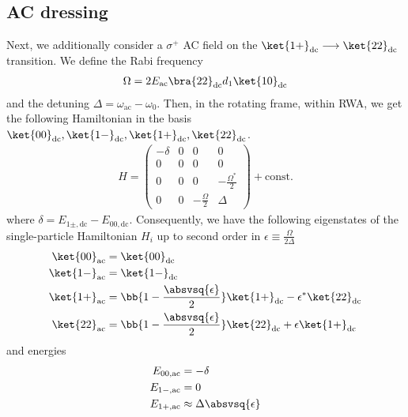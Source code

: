 \subsection{AC dressing}
Next, we additionally consider a $\sigma^+$ AC field on the $\ket{1+}_\text{dc}\longrightarrow\ket{22}_\text{dc}$ transition. We define the Rabi frequency
\begin{align}
\Omega=2E_\text{ac}\bra{22}_\text{dc}d_1\ket{10}_\text{dc}
\end{align}
and the detuning $\Delta=\omega_\text{ac}-\omega_0$.
Then, in the rotating frame, within RWA, we
get the following Hamiltonian in the basis
$\ket{00}_\text{dc},\ket{1-}_\text{dc},\ket{1+}_\text{dc},\ket{22}_\text{dc}$.
\begin{align}
H=\begin{pmatrix} -\delta & 0 & 0 & 0\\
0 & 0 & 0 & 0\\
0 & 0 & 0 & -\frac{\Omega^*}{2} \\
0 & 0 & -\frac{\Omega}{2} & \Delta
\end{pmatrix}+\text{const.}
\end{align}
where $\delta = E_{1\pm,\text{dc}}-E_{00,\text{dc}}$. Consequently, we have the following eigenstates of the single-particle Hamiltonian $H_i$ up to second order in $\epsilon\equiv\frac{\Omega}{2\Delta}$
\begin{align}
\ket{00}_\text{ac}&=\ket{00}_\text{dc}\\
\ket{1-}_\text{ac}&=\ket{1-}_\text{dc}\\
    \ket{1+}_\text{ac}&=\bb{1-\frac{\absvsq{\epsilon}}{2}}\ket{1+}_\text{dc}-\epsilon^*\ket{22}_\text{dc}\\
    \ket{22}_\text{ac}&=\bb{1-\frac{\absvsq{\epsilon}}{2}}\ket{22}_\text{dc}+\epsilon\ket{1+}_\text{dc}
\end{align}
and energies
\begin{align}
E_{00,\text{ac}}&=-\delta\\
E_{1-,\text{ac}}&=0\\
E_{1+,\text{ac}}&\approx \Delta\absvsq{\epsilon}
\end{align}

